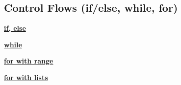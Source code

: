 \subsection{Control Flows (if/else, while, for)}
    {\centering\underline{\textbf{if, else}} \par}
    

    {\centering\underline{\textbf{while}} \par}
    

    {\centering\underline{\textbf{for with range}} \par}
    

    {\centering\underline{\textbf{for with lists}} \par}
    
